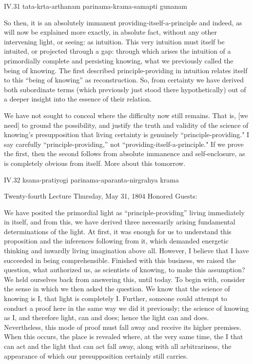 IV.31
tata-krta-arthanam parinama-krama-samapti gunanam

So then, it is an absolutely immanent
providing-itself-a-principle and indeed,
as will now be explained more exactly,
in absolute fact,
without any other intervening light,
or seeing: as intuition.
This very intuition must itself be intuited,
or projected through a gap:
through which arises the intuition of
a primordially complete and persisting knowing,
what we previously called the being of knowing.
The first described principle-providing in intuition
relates itself to this “being of knowing” as reconstruction.
So, from certainty we have derived both subordinate terms
(which previously just stood there hypothetically)
out of a deeper insight into the essence of their relation.

We have not sought to conceal
where the difficulty now still remains.
That is, [we need] to ground the possibility,
and justify the truth and validity
of the science of knowing's presupposition that
living certainty is genuinely “principle-providing."
I say carefully “principle-providing,”
not “providing-itself-a-principle."
If we prove the first, then the second follows
from absolute immanence and self-enclosure,
as is completely obvious from itself.
More about this tomorrow.

IV.32
ksana-pratiyogi parinama-aparanta-nirgrahya krama

Twenty-fourth Lecture
Thursday, May 31, 1804
Honored Guests:

We have posited the primordial light
as “principle-providing”
living immediately in itself,
and from this, we have derived
three necessarily arising fundamental
determinations of the light.
At first, it was enough for us
to understand this proposition
and the inferences following from it,
which demanded energetic thinking and
inwardly living imagination above all.
However, I believe that I have succeeded in being comprehensible.
Finished with this business, we raised the question,
what authorized us, as scientists of knowing,
to make this assumption?
We held ourselves back from answering this, until today.
To begin with, consider the sense
in which we then asked the question.
We know that the science of knowing is I,
that light is completely I.
Further, someone could attempt to conduct a proof here
in the same way we did it previously;
the science of knowing as I, and therefore light, can and does;
hence the light can and does.
Nevertheless, this mode of proof must fall away
and receive its higher premises.
When this occurs, the place is revealed where,
at the very same time,
the I that can act and the light that can act fall away,
along with all arbitrariness,
the appearance of which our presupposition
certainly still carries.

